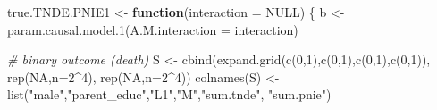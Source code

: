 \documentclass[
]{book}
\newenvironment{Shaded}{\begin{snugshade}}{\end{snugshade}}
\newcommand{\AttributeTok}[1]{\textcolor[rgb]{0.77,0.63,0.00}{#1}}
\newcommand{\CommentTok}[1]{\textcolor[rgb]{0.56,0.35,0.01}{\textit{#1}}}
\newcommand{\ConstantTok}[1]{\textcolor[rgb]{0.00,0.00,0.00}{#1}}
\newcommand{\ControlFlowTok}[1]{\textcolor[rgb]{0.13,0.29,0.53}{\textbf{#1}}}
\newcommand{\DecValTok}[1]{\textcolor[rgb]{0.00,0.00,0.81}{#1}}
\newcommand{\FunctionTok}[1]{\textcolor[rgb]{0.00,0.00,0.00}{#1}}
\newcommand{\NormalTok}[1]{#1}
\newcommand{\OtherTok}[1]{\textcolor[rgb]{0.56,0.35,0.01}{#1}}
\newcommand{\SpecialCharTok}[1]{\textcolor[rgb]{0.00,0.00,0.00}{#1}}
\newcommand{\StringTok}[1]{\textcolor[rgb]{0.31,0.60,0.02}{#1}}
\begin{document}
\begin{Shaded}
\begin{Highlighting}[]
\NormalTok{true.TNDE.PNIE1 }\OtherTok{\textless{}{-}} \ControlFlowTok{function}\NormalTok{(}\AttributeTok{interaction =} \ConstantTok{NULL}\NormalTok{) \{}
\NormalTok{  b }\OtherTok{\textless{}{-}} \FunctionTok{param.causal.model.1}\NormalTok{(}\AttributeTok{A.M.interaction =}\NormalTok{ interaction)}
  
  \CommentTok{\# binary outcome (death)}
\NormalTok{  S }\OtherTok{\textless{}{-}} \FunctionTok{cbind}\NormalTok{(}\FunctionTok{expand.grid}\NormalTok{(}\FunctionTok{c}\NormalTok{(}\DecValTok{0}\NormalTok{,}\DecValTok{1}\NormalTok{),}\FunctionTok{c}\NormalTok{(}\DecValTok{0}\NormalTok{,}\DecValTok{1}\NormalTok{),}\FunctionTok{c}\NormalTok{(}\DecValTok{0}\NormalTok{,}\DecValTok{1}\NormalTok{),}\FunctionTok{c}\NormalTok{(}\DecValTok{0}\NormalTok{,}\DecValTok{1}\NormalTok{)), }\FunctionTok{rep}\NormalTok{(}\ConstantTok{NA}\NormalTok{,}\AttributeTok{n=}\DecValTok{2}\SpecialCharTok{\^{}}\DecValTok{4}\NormalTok{), }\FunctionTok{rep}\NormalTok{(}\ConstantTok{NA}\NormalTok{,}\AttributeTok{n=}\DecValTok{2}\SpecialCharTok{\^{}}\DecValTok{4}\NormalTok{))}
  \FunctionTok{colnames}\NormalTok{(S) }\OtherTok{\textless{}{-}} \FunctionTok{list}\NormalTok{(}\StringTok{"male"}\NormalTok{,}\StringTok{"parent\_educ"}\NormalTok{,}\StringTok{"L1"}\NormalTok{,}\StringTok{"M"}\NormalTok{,}\StringTok{"sum.tnde"}\NormalTok{, }\StringTok{"sum.pnie"}\NormalTok{)}
  

\end{Highlighting}
\end{Shaded}
\end{document}
